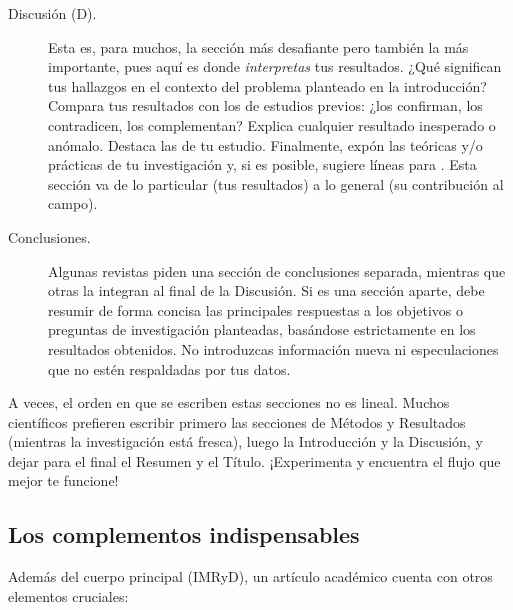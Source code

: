 \begin{description}
  \item[Discusión (D).] Esta es, para muchos, la sección más desafiante pero
    también la más importante, pues aquí es donde \emph{interpretas} tus
    resultados.
    ¿Qué significan tus hallazgos en el contexto del problema planteado en la
    introducción?
    Compara tus resultados con los de estudios previos: ¿los confirman, los
    contradicen, los complementan?
    Explica cualquier resultado inesperado o anómalo.
    Destaca las  de tu estudio.
    Finalmente, expón las  teóricas y/o prácticas
    de tu investigación y, si es posible, sugiere líneas para
    .
    Esta sección va de lo particular (tus resultados) a lo general (su
    contribución al campo).

  \item[Conclusiones.] Algunas revistas piden una sección de conclusiones
    separada, mientras que otras la integran al final de la Discusión.
    Si es una sección aparte, debe resumir de forma concisa las principales
    respuestas a los objetivos o preguntas de investigación planteadas,
    basándose estrictamente en los resultados obtenidos.
    No introduzcas información nueva ni especulaciones que no estén
    respaldadas por tus datos.
\end{description}

A veces, el orden en que se escriben estas secciones no es lineal.
Muchos científicos prefieren escribir primero las secciones de Métodos y
Resultados (mientras la investigación está fresca), luego la Introducción y la
Discusión, y dejar para el final el Resumen y el Título.
¡Experimenta y encuentra el flujo que mejor te funcione!

\subsection*{Los complementos indispensables}
\label{sub:complementosarticulo}

Además del cuerpo principal (IMRyD), un artículo académico cuenta con otros
elementos cruciales:

